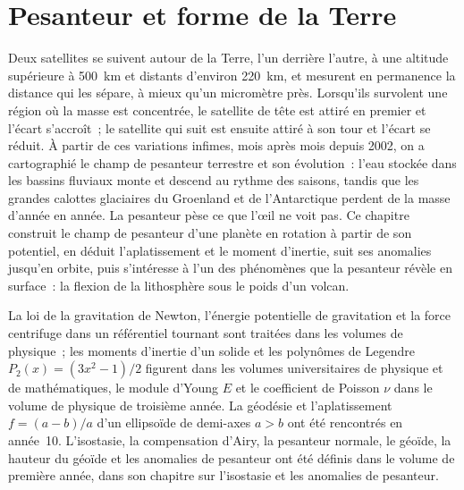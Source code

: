\chapter{Pesanteur et forme de la Terre}\label{ch:b3:gravity-geodesy}

Deux satellites se suivent autour de la Terre, l'un derrière l'autre, à une altitude
supérieure à \qty{500}{km} et distants d'environ \qty{220}{km}, et mesurent en permanence la distance
qui les sépare, à mieux qu'un micromètre près.
Lorsqu'ils survolent une région où la masse est concentrée, le satellite de tête est attiré
en premier et l'écart s'accroît~; le satellite qui suit est ensuite attiré à son tour et
l'écart se réduit. À partir de ces variations infimes, mois après mois depuis 2002, on a
cartographié le champ de pesanteur terrestre et son évolution~: l'eau stockée dans les bassins
fluviaux monte et descend au rythme des saisons, tandis que les grandes calottes glaciaires
du Groenland et de l'Antarctique perdent de la masse d'année en année. La pesanteur pèse
ce que l'œil ne voit pas. Ce chapitre construit le champ de pesanteur d'une planète en
rotation à partir de son potentiel, en déduit l'aplatissement et le moment d'inertie, suit
ses anomalies jusqu'en orbite, puis s'intéresse à l'un des phénomènes que la pesanteur révèle
en surface~: la flexion de la lithosphère sous le poids d'un volcan.

\begin{recall}
La loi de la gravitation de Newton, l'énergie potentielle de gravitation et la force
centrifuge dans un référentiel tournant sont traitées dans les volumes de physique~; les moments
d'inertie d'un solide et les polynômes de Legendre $P_2(x) = (3x^2 - 1)/2$ figurent dans les
volumes universitaires de physique et de mathématiques, le module d'Young $E$ et le coefficient
de Poisson $\nu$ dans le volume de physique de troisième année. La géodésie et l'aplatissement
$f = (a - b)/a$ d'un ellipsoïde de demi-axes $a > b$ ont été rencontrés en
année~10. L'isostasie, la compensation d'Airy, la pesanteur normale, le géoïde,
la hauteur du géoïde et les anomalies de pesanteur ont été définis dans le volume de première année, dans son
chapitre sur l'isostasie et les anomalies de pesanteur.
\end{recall}

